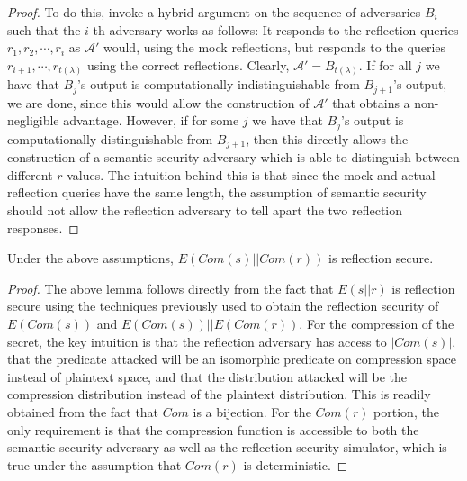 \begin{proof}
    To do this, invoke a hybrid argument on the sequence of adversaries $B_i$
    such that the $i$-th adversary works as follows: It responds to the
    reflection queries $r_1, r_2, \cdots, r_i$ as $\mathcal{A'}$ would,
    using the mock reflections, but responds to the queries $r_{i+1},
    \cdots, r_{t(\lambda)}$ using the correct reflections. Clearly,
    $\mathcal{A'} = B_{t(\lambda)}$. If for all $j$ we have that $B_j$'s output
    is computationally indistinguishable from $B_{j+1}$'s output, we are done,
    since this would allow the construction of $\mathcal{A'}$ that obtains a
    non-negligible advantage. However, if for some $j$ we have that $B_j$'s
    output is computationally distinguishable from $B_{j+1}$, then this
    directly allows the construction of a semantic security adversary which is
    able to distinguish between different $r$ values. The intuition behind this
    is that since the mock and actual reflection queries have the same length,
    the assumption of semantic security should not allow the reflection
    adversary to tell apart the two reflection responses.
\end{proof}

\begin{lemma}
    Under the above assumptions, $E(Com(s) || Com(r))$ is reflection secure.
\end{lemma}

\begin{proof}
    The above lemma follows directly from the fact that $E(s || r)$ is
    reflection secure using the techniques previously used to obtain the
    reflection security of $E(Com(s))$ and $E(Com(s)) || E(Com(r))$. For the
    compression of the secret, the key intuition is that the reflection
    adversary has access to $|Com(s)|$, that the predicate attacked will be an
    isomorphic predicate on compression space instead of plaintext space, and
    that the distribution attacked will be the compression distribution instead
    of the plaintext distribution. This is readily obtained from the fact that
    $Com$ is a bijection. For the $Com(r)$ portion, the only
    requirement is that the compression function is accessible to both the
    semantic security adversary as well as the reflection security simulator,
    which is true under the assumption that $Com(r)$ is deterministic.
\end{proof}
